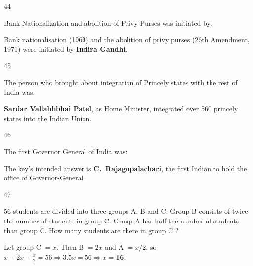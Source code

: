 \begin{question}{44}
{Bank Nationalization and abolition of Privy Purses was initiated by:\par}
\begin{explain}
Bank nationalisation (1969) and the abolition of privy purses (26th Amendment, 1971) were initiated by \textbf{Indira Gandhi}.
\end{explain}
\end{question}

\begin{question}{45}
{The person who brought about integration of Princely states with the rest of India was:\par}
\begin{explain}
\textbf{Sardar Vallabhbhai Patel}, as Home Minister, integrated over 560 princely states into the Indian Union.
\end{explain}
\end{question}

\begin{question}{46}
{The first Governor General of India was:\par}
\begin{explain}
The key's intended answer is \textbf{C.~Rajagopalachari}, the first Indian to hold the office of Governor-General.
\end{explain}
\end{question}

\begin{question}{47}
{56 students are divided into three groups A, B and C. Group B consists of twice the number of students in group C. Group A has half the number of students than group C. How many students are there in group C ?\par}
\begin{explain}
Let group C $=x$. Then B $=2x$ and A $=x/2$, so $x+2x+\tfrac x2=56\Rightarrow3.5x=56\Rightarrow x=\mathbf{16}$.
\end{explain}
\end{question}

